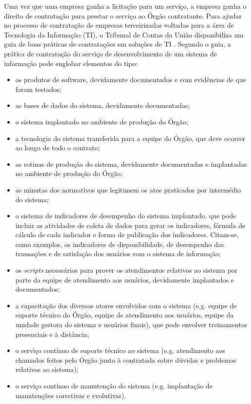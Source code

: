 Uma vez que uma empresa ganha a licitação para um serviço, a empresa ganha o direito de contratação para prestar o serviço ao Órgão contratante. Para ajudar no processo de contratação de empresas terceirizadas voltadas para a área de Tecnologia da Informação (TI), o Tribunal de Contas da União disponibiliza um guia de boas práticas de contratações em soluções de TI \cite{guia_boas_praticas}. Segundo o guia, a prática de contratação do serviço de desenvolvimento de um sistema de informação pode englobar elementos do tipo:
\begin{itemize}
\item os produtos de software, devidamente documentados e com evidências de que foram testados;
\item as bases de dados do sistema, devidamente documentadas;
\item o sistema implantado no ambiente de produção do Órgão;
\item a tecnologia do sistema transferida para a equipe do Órgão, que deve ocorrer ao longo de todo o contrato;
\item as rotinas de produção do sistema, devidamente documentadas e implantadas no ambiente de produção do Órgão;
\item as minutas dos normativos que legitimem os atos praticados por intermédio do sistema;
\item o sistema de indicadores de desempenho do sistema implantado, que pode incluir as atividades de coleta de dados para gerar os indicadores, fórmula de cálculo de cada indicador e forma de publicação dos indicadores. Citam-se, como exemplos, os indicadores de disponibilidade, de desempenho das transações e de satisfação dos usuários com o sistema de informação;
\item os \textit{scripts} necessários para prover os atendimentos relativos ao sistema por parte da equipe de atendimento aos usuários, devidamente implantados e documentados;
\item a capacitação dos diversos atores envolvidos com o sistema (e.g. equipe de suporte técnico do Órgão, equipe de atendimento aos usuários, equipe da unidade gestora do sistema e usuários finais), que pode envolver treinamentos presenciais e à distância;
\item o serviço contínuo de suporte técnico ao sistema (e.g. atendimento aos chamados feitos pelo Órgão junto à contratada sobre dúvidas e problemas relativos ao sistema);
\item o serviço contínuo de manutenção do sistema (e.g. implantação de manutenções corretivas e evolutivas).
\end{itemize} 

